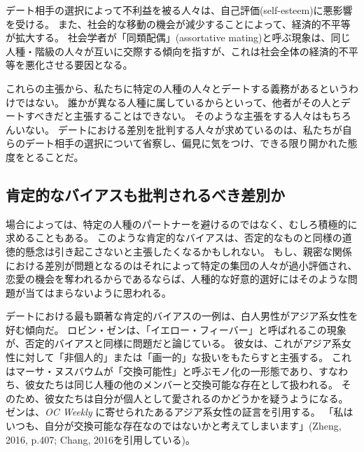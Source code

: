 \documentclass[paper=a4,book,openany]{jlreq}
\begin{document}
デート相手の選択によって不利益を被る人々は、自己評価(self-esteem)に悪影響を受ける。
また、社会的な移動の機会が減少することによって、経済的不平等が拡大する。
社会学者が「同類配偶」(assortative mating)と呼ぶ現象は、同じ人種・階級の人々が互いに交際する傾向を指すが、これは社会全体の経済的不平等を悪化させる要因となる\citep{milanovic19:_rich_like_me}。

これらの主張から、私たちに特定の人種の人々とデートする義務があるというわけではない。
誰かが異なる人種に属しているからといって、他者がその人とデートすべきだと主張することはできない。
そのような主張をする人々はもちろんいない。
デートにおける差別を批判する人々が求めているのは、私たちが自らのデート相手の選択について省察し、偏見に気をつけ、できる限り開かれた態度をとることだ。

\subsection{肯定的なバイアスも批判されるべき差別か}

場合によっては、特定の人種のパートナーを避けるのではなく、むしろ積極的に求めることもある。
このような肯定的なバイアスは、否定的なものと同様の道徳的懸念は引き起こさないと主張したくなるかもしれない。
もし、親密な関係における差別が問題となるのはそれによって特定の集団の人々が過小評価され、恋愛の機会を奪われるからであるならば、人種的な好意的選好にはそのような問題が当てはまらないように思われる。

デートにおける最も顕著な肯定的バイアスの一例は、白人男性がアジア系女性を好む傾向だ。
ロビン・ゼンは、「イエロー・フィーバー」と呼ばれるこの現象が、否定的バイアスと同様に問題だと論じている。
彼女は、これがアジア系女性に対して「非個人的」または「画一的」な扱いをもたらすと主張する。
これはマーサ・ヌスバウムが「交換可能性」と呼ぶモノ化の一形態であり、すなわち、彼女たちは同じ人種の他のメンバーと交換可能な存在として扱われる。
そのため、彼女たちは自分が個人として愛されるのかどうかを疑うようになる。
ゼンは、\emph{OC Weekly} に寄せられたあるアジア系女性の証言を引用する。
「私はいつも、自分が交換可能な存在なのではないかと考えてしまいます」(Zheng, 2016, p.407; Chang, 2016を引用している)\nocite{chang06:_yellow_fever}。
\end{document}
